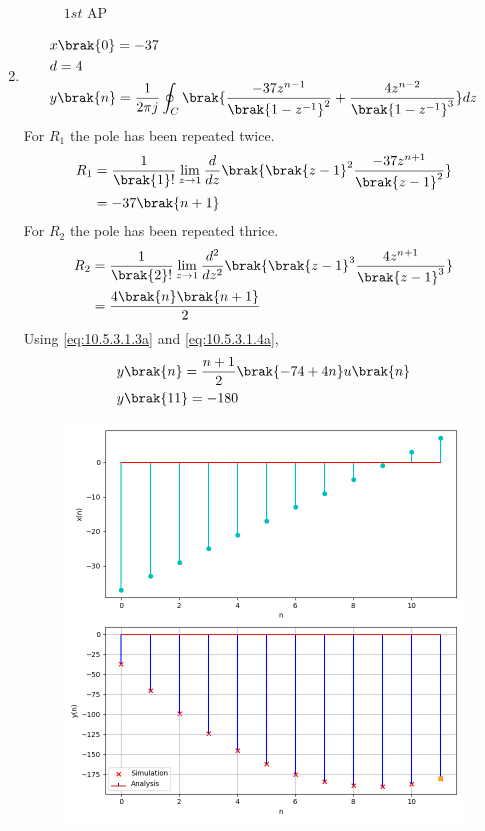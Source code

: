 \documentclass[journal,12pt,twocolumn]{IEEEtran}
\theoremstyle{remark}
\begin{document}
\begin{enumerate}[label=(\alph*)]
\begin{figure}[h!]
        \caption{$1st$ AP}
    \end{figure}
    \item \begin{align}
        &x\brak{0}=-37 \\
        &d=4 \\
        &y\brak{n}=\frac{1}{2\pi j}\oint_{C}\brak{\dfrac{-37z^{n-1}}{\brak{1-z^{-1}}^2} + \dfrac{4z^{n-2}}{\brak{1-z^{-1}}^{3}}}dz
    \end{align}
    For $R_1$ the pole has been repeated twice.
\begin{align}
    R_1&=\frac{1}{\brak {1}!}\lim\limits_{z\to 1}\frac{d}{dz}\brak {{\brak{z-1}}^{2}\frac{-37z^{n+1}}{{\brak{z-1}}^2}}\\
    &=-37\brak{n+1}\label{eq:10.5.3.1.3a}
\end{align}
    For $R_2$ the pole has been repeated thrice.
\begin{align}
    R_2&=\frac{1}{\brak {2}!}\lim\limits_{z\to 1}\frac{d^{2}}{dz^{2}}\brak {{\brak{z-1}}^{3}\frac{4z^{n+1}}{{\brak{z-1}}^3}}\\
    &=\frac{4\brak{n}\brak{n+1}}{2}\label{eq:10.5.3.1.4a}
\end{align}
Using \eqref{eq:10.5.3.1.3a} and \eqref{eq:10.5.3.1.4a},
\begin{align}
    &y\brak{n}=\dfrac{n+1}{2}\brak{-74+4n}u\brak{n}\\
    &y\brak{11}=-180
\end{align}
    \begin{figure}[h!]
        \centering
        \includegraphics[width=\columnwidth]{ncert-maths/10/5/3/1/figs/plt2.png}

\end{figure}
\end{enumerate}
\end{document}
